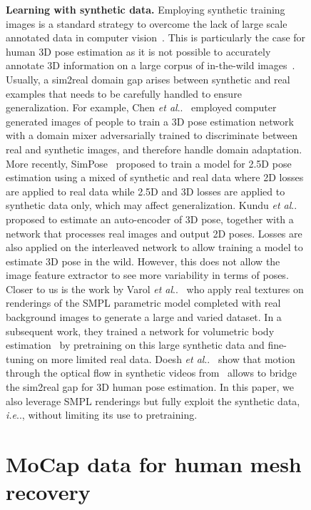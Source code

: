 \documentclass[10pt,twocolumn,letterpaper]{article}
\makeatletter
\DeclareRobustCommand\onedot{\futurelet\@let@token\@onedot}
\def\@onedot{\ifx\@let@token.\else.\null\fi\xspace}
\def\ie{\emph{i.e}\onedot} \def\Ie{\emph{I.e}\onedot}
\def\etal{\emph{et al}\onedot}
\renewcommand{\paragraph}[1]{\vspace{0.02cm}\noindent\textbf{#1}}
\makeatother
\begin{document}
\begin{figure}
\paragraph{Learning with synthetic data.}
Employing synthetic training images is a standard strategy to overcome the lack of large scale annotated data in computer vision~\cite{GaidonLP18}. This is particularly the case for human 3D pose estimation as it is not possible to accurately annotate 3D information on a large corpus of in-the-wild images~\cite{ChenWLSWTLCC16,RogezS16,surreal}. Usually, a sim2real domain  gap arises  between  synthetic  and real examples that needs to be carefully handled to ensure generalization.  For example, Chen \etal~\cite{ChenWLSWTLCC16} employed computer generated images of people to train a 3D pose estimation network with a domain mixer adversarially trained to discriminate between real and synthetic images, and therefore handle domain adaptation. 
More recently, SimPose~\cite{simpose} proposed to train a model for 2.5D pose estimation using a mixed of synthetic and real data where 2D losses are applied to real data while 2.5D and 3D losses are applied to synthetic data only, which may affect generalization.
Kundu \etal~\cite{kundu2020unsupervised} proposed to estimate an auto-encoder of 3D pose, together with a network that processes real images and output 2D poses. Losses are also applied on the interleaved network to allow training a model to estimate 3D pose in the wild. However, this does not allow the image feature extractor to see more variability in terms of poses. Closer to us is the work by Varol \etal~\cite{surreal} who apply real textures on renderings of the SMPL parametric model completed with real background images to generate a large and varied dataset. In a subsequent work, they trained a network for volumetric body estimation~\cite{bodynet} by pretraining on this large synthetic data and fine-tuning on more limited real data.
Doesh \etal~\cite{sim2real} show that motion through the optical flow in synthetic videos from~\cite{surreal} allows to bridge the sim2real gap for 3D human pose estimation.
In this paper, we also leverage SMPL renderings but fully exploit the synthetic data, \ie, without limiting its use to pretraining.




 \section{MoCap data for human mesh recovery}
\label{sec:method}






\end{figure}
\end{document}
